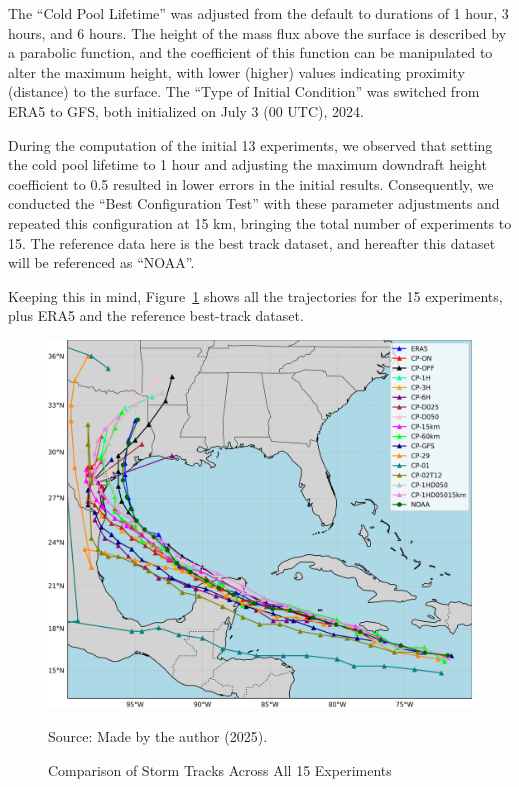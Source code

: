 The “Cold Pool Lifetime” was adjusted from the default to durations of 1 hour, 3 hours, and 6 hours. The height of the mass flux above the surface is described by a parabolic function, and the coefficient of this function can be manipulated to alter the maximum height, with lower (higher) values indicating proximity (distance) to the surface. The “Type of Initial Condition” was switched from ERA5 to GFS, both initialized on July 3 (00 UTC), 2024.

During the computation of the initial 13 experiments, we observed that setting the cold pool lifetime to 1 hour and adjusting the maximum downdraft height coefficient to 0.5 resulted in lower errors in the initial results. Consequently, we conducted the “Best Configuration Test” with these parameter adjustments and repeated this configuration at 15 km, bringing the total number of experiments to 15. The reference data here is the best track dataset, and hereafter this dataset will be referenced as “NOAA”. 

Keeping this in mind, Figure~\ref{fig:all_tracks_before} shows all the trajectories for the 15 experiments, plus ERA5 and the reference best-track dataset.

\begin{figure}[!htb]
    \centering
    \caption{Comparison of Storm Tracks Across All 15 Experiments} %
    \includegraphics[width=\textwidth]{docs/figuras/chapter5/ALL_tracks_before_filter.png} %
    \vspace{0.5em}
    
    Source: Made by the author (2025). %
    \label{fig:all_tracks_before} %
\end{figure}

